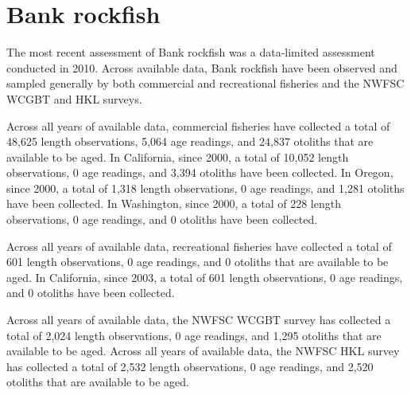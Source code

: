 \documentclass[11pt,
  english,
  letterpaper,
]{article}
\begin{document}

\hypertarget{bank-rockfish}{%
\section{Bank rockfish}\label{bank-rockfish}}

\leavevmode\tagmcend\tagstructend


The most recent assessment of Bank rockfish was a data-limited assessment conducted in 2010. Across available data, Bank rockfish have been observed and sampled generally by both commercial and recreational fisheries and the NWFSC WCGBT and HKL surveys.

\leavevmode\tagmcend\tagstructend\par


Across all years of available data, commercial fisheries have collected a total of 48,625 length observations, 5,064 age readings, and 24,837 otoliths that are available to be aged. In California, since 2000, a total of 10,052 length observations, 0 age readings, and 3,394 otoliths have been collected. In Oregon, since 2000, a total of 1,318 length observations, 0 age readings, and 1,281 otoliths have been collected. In Washington, since 2000, a total of 228 length observations, 0 age readings, and 0 otoliths have been collected.

\leavevmode\tagmcend\tagstructend\par


Across all years of available data, recreational fisheries have collected a total of 601 length observations, 0 age readings, and 0 otoliths that are available to be aged. In California, since 2003, a total of 601 length observations, 0 age readings, and 0 otoliths have been collected.

\leavevmode\tagmcend\tagstructend\par


Across all years of available data, the NWFSC WCGBT survey has collected a total of 2,024 length observations, 0 age readings, and 1,295 otoliths that are available to be aged. Across all years of available data, the NWFSC HKL survey has collected a total of 2,532 length observations, 0 age readings, and 2,520 otoliths that are available to be aged.
\end{document}

